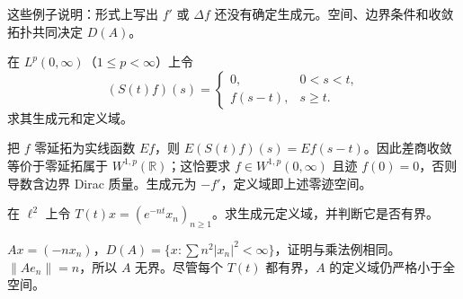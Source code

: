 这些例子说明：形式上写出 $f'$ 或 $\Delta f$ 还没有确定生成元。空间、边界条件和收敛拓扑共同决定 $D(A)$。

\begin{exercise}[吸收边界的运输]\label{ex:y9-transport-boundary}
在 $L^p(0,\infty)$（$1\le p<\infty$）上令
\[
 (S(t)f)(s)=\begin{cases}0,&0<s<t,\\f(s-t),&s\ge t.\end{cases}
\]
求其生成元和定义域。
\end{exercise}
\begin{solution}
把 $f$ 零延拓为实线函数 $Ef$，则 $E(S(t)f)(s)=Ef(s-t)$。因此差商收敛等价于零延拓属于 $W^{1,p}(\mathbb R)$；这恰要求 $f\in W^{1,p}(0,\infty)$ 且迹 $f(0)=0$，否则导数含边界 Dirac 质量。生成元为 $-f'$，定义域即上述零迹空间。
\end{solution}

\begin{exercise}[对角耗散]\label{ex:y9-diagonal}
在 $\ell^2$ 上令 $T(t)x=(e^{-nt}x_n)_{n\ge1}$。求生成元定义域，并判断它是否有界。
\end{exercise}
\begin{solution}
$Ax=(-nx_n)$，$D(A)=\{x:\sum n^2|x_n|^2<\infty\}$，证明与乘法例相同。$\|Ae_n\|=n$，所以 $A$ 无界。尽管每个 $T(t)$ 都有界，$A$ 的定义域仍严格小于全空间。
\end{solution}
